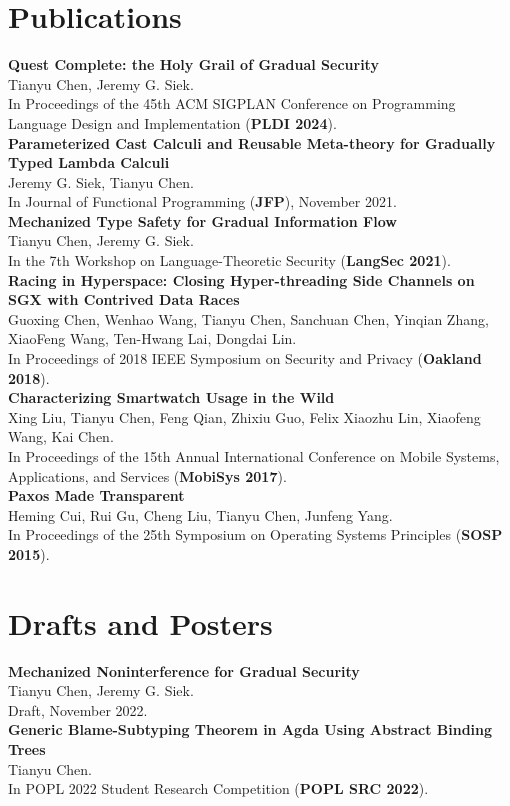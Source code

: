 \section*{\sc Publications}

{\bf Quest Complete: the Holy Grail of Gradual Security} \\
Tianyu Chen, Jeremy G. Siek. \\
In Proceedings of the 45th ACM SIGPLAN Conference on Programming Language Design and
Implementation (\textbf{PLDI 2024}). \\
{\bf Parameterized Cast Calculi and Reusable Meta-theory for Gradually Typed Lambda Calculi } \\
Jeremy G. Siek, Tianyu Chen. \\
In Journal of Functional Programming (\textbf{JFP}), November 2021. \\
{\bf Mechanized Type Safety for Gradual Information Flow} \\
Tianyu Chen, Jeremy G. Siek. \\
In the 7th Workshop on Language-Theoretic Security (\textbf{LangSec 2021}). \\
{\bf Racing in Hyperspace: Closing Hyper-threading Side Channels on SGX with Contrived Data Races} \\
Guoxing Chen, Wenhao Wang, Tianyu Chen, Sanchuan Chen, Yinqian Zhang, XiaoFeng Wang, Ten-Hwang Lai, Dongdai Lin. \\
In Proceedings of 2018 IEEE Symposium on Security and Privacy (\textbf{Oakland 2018}). \\
{\bf Characterizing Smartwatch Usage in the Wild} \\
Xing Liu, Tianyu Chen, Feng Qian, Zhixiu Guo, Felix Xiaozhu Lin, Xiaofeng Wang, Kai Chen. \\
In Proceedings of the 15th Annual International Conference on Mobile Systems, Applications,
and Services (\textbf{MobiSys 2017}). \\
{\bf Paxos Made Transparent} \\
Heming Cui, Rui Gu, Cheng Liu, Tianyu Chen, Junfeng Yang. \\
In Proceedings of the 25th Symposium on Operating Systems Principles (\textbf{SOSP 2015}). \\


\section*{\sc Drafts and Posters}

{\bf Mechanized Noninterference for Gradual Security } \\
Tianyu Chen, Jeremy G. Siek. \\
Draft, November 2022. \\
{\bf Generic Blame-Subtyping Theorem in Agda Using Abstract Binding Trees } \\
Tianyu Chen. \\
In POPL 2022 Student Research Competition (\textbf{POPL SRC 2022}). \\

